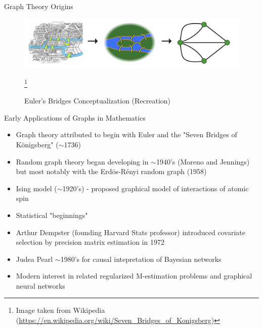 \documentclass{beamer}
\begin{document}
\begin{frame}{Graph Theory Origins \cite{imperatorskaia_akademia_nauk_russia_commentarii_1726,shields_cultural_2012}}
\begin{figure}
    \centering 
    \includegraphics[scale=0.5]{Wikipedia_Bridges.png}
    \caption{Euler's Bridges Conceptualization (Recreation)}\footnote{Image taken from Wikipedia (\url{https://en.wikipedia.org/wiki/Seven_Bridges_of_Konigsberg})}
\end{figure}
\end{frame}



\begin{frame}{Early Applications of Graphs in Mathematics}
\begin{itemize}
    \item Graph theory attributed to begin with Euler and the "Seven Bridges of K\"onigsberg" ($\sim$1736)
    \item Random graph theory began developing in $\sim$1940's (Moreno and Jennings) but most notably with the Erd\"os-R\'enyi random graph (1958)
    \item Ising model ($\sim$1920's) - proposed graphical model of interactions of atomic spin
    \item Statistical "beginnings"%
    \item Arthur Dempster (founding Harvard Stats professor) introduced covariate selection by precision matrix estimation in 1972 \cite{dempster_covariance_1972}
    \item Judea Pearl $\sim$1980's for causal intepretation of Bayesian networks
    \item Modern interest in related regularized M-estimation problems and graphical neural networks 
\end{itemize}
\end{frame}
\end{document}
